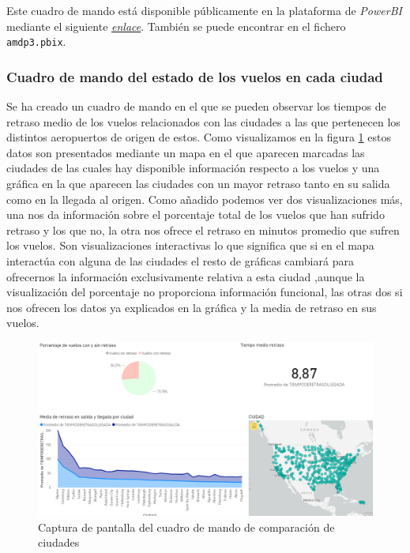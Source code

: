 \documentclass{article}
\begin{document}
Este cuadro de mando está disponible públicamente en la plataforma de \textit{PowerBI} mediante el siguiente \href{https://app.powerbi.com/view?r=eyJrIjoiODUwZTA1MmMtMWIwOS00MTVlLWFlYzUtZmI5YzgwMzFhNDY5IiwidCI6IjNmMjI3ZGJhLWYzZjQtNDU0NC1iMzE0LWM2ZWZkMzBlMGQwMCIsImMiOjh9}{\textit{enlace}}. También se puede encontrar en el fichero \texttt{amdp3.pbix}.\\


\newpage
\subsubsection{Cuadro de mando del estado de los vuelos en cada ciudad}
Se ha creado un cuadro de mando en el que se pueden observar los tiempos de retraso medio de los vuelos relacionados con las ciudades a las que pertenecen los distintos aeropuertos de origen de estos. Como visualizamos en la figura \ref{fig:dashboardCiudades} estos datos son presentados mediante un mapa en el que aparecen marcadas las ciudades de las cuales hay disponible información respecto a los vuelos y una gráfica en la que aparecen las ciudades con un mayor retraso tanto en su salida como en la llegada al origen. Como añadido podemos ver dos visualizaciones más, una nos da información sobre el porcentaje total de los vuelos que han sufrido retraso y los que no, la otra nos ofrece el retraso en minutos promedio que sufren los vuelos. Son visualizaciones interactivas lo que significa que si en el mapa interactúa con alguna de las ciudades el resto de gráficas cambiará para ofrecernos la información exclusivamente relativa a esta ciudad ,aunque la visualización del porcentaje no proporciona información funcional, las otras dos si nos ofrecen los datos ya explicados en la gráfica y la media de retraso en sus vuelos.


\begin{figure}[h!]
    \centering
    \includegraphics[scale=0.5]{images/cuadrocris.png}
    \caption{Captura de pantalla del cuadro de mando de comparación de ciudades}
    \label{fig:dashboardCiudades}
\end{figure}
\end{document}
